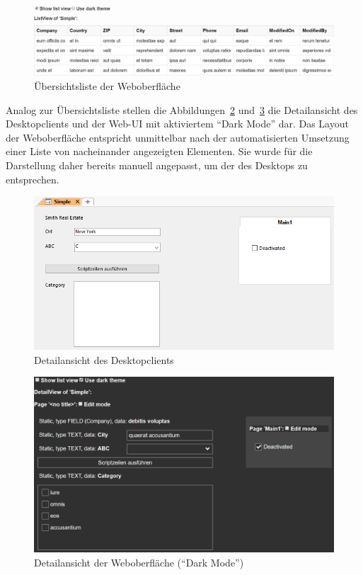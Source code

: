 \begin{figure}
    \centering
    \captionsetup{justification=centering}
    \includegraphics[width=\textwidth]{figures/listview_new.png}
        \caption{Übersichtsliste der Weboberfläche}\label{fig:listview_new}
\end{figure}

Analog zur Übersichtsliste stellen die Abbildungen~\ref{fig:detailview_crm} und~\ref{fig:detailview_new} die Detailansicht des Desktopclients und der Web-UI mit aktiviertem \enquote{Dark Mode} dar. Das Layout der Weboberfläche entspricht unmittelbar nach der automatisierten Umsetzung einer Liste von nacheinander angezeigten Elementen. Sie wurde für die Darstellung daher bereits manuell angepasst, um der des Desktops zu entsprechen.

\begin{figure}
    \centering
    \captionsetup{justification=centering}
    \includegraphics[width=\textwidth]{figures/detailview_crm.png}
        \caption{Detailansicht des Desktopclients}\label{fig:detailview_crm}
\end{figure}

\begin{figure}
    \centering
    \captionsetup{justification=centering}
    \includegraphics[width=\textwidth]{figures/detailview_new.png}
        \caption{Detailansicht der Weboberfläche (\enquote{Dark Mode})}\label{fig:detailview_new}
\end{figure}

